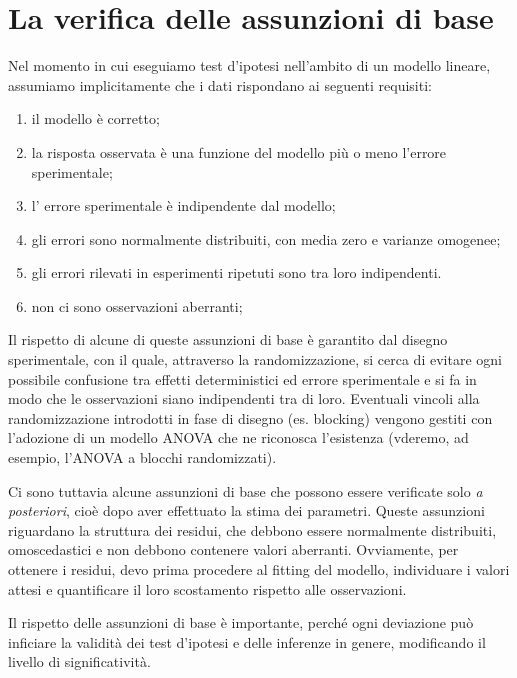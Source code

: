 \documentclass[a4paper,12pt,oneside]{book}
\providecommand{\tightlist}{%
  \setlength{\itemsep}{0pt}\setlength{\parskip}{0pt}}
\begin{document}
\hypertarget{la-verifica-delle-assunzioni-di-base}{%
\chapter{La verifica delle assunzioni di base}\label{la-verifica-delle-assunzioni-di-base}}

Nel momento in cui eseguiamo test d'ipotesi nell'ambito di un modello lineare, assumiamo implicitamente che i dati rispondano ai seguenti requisiti:

\begin{enumerate}
\def\labelenumi{\arabic{enumi}.}
\tightlist
\item
  il modello è corretto;
\item
  la risposta osservata è una funzione del modello più o meno l'errore sperimentale;
\item
  l' errore sperimentale è indipendente dal modello;
\item
  gli errori sono normalmente distribuiti, con media zero e varianze omogenee;
\item
  gli errori rilevati in esperimenti ripetuti sono tra loro indipendenti.
\item
  non ci sono osservazioni aberranti;
\end{enumerate}

Il rispetto di alcune di queste assunzioni di base è garantito dal disegno sperimentale, con il quale, attraverso la randomizzazione, si cerca di evitare ogni possibile confusione tra effetti deterministici ed errore sperimentale e si fa in modo che le osservazioni siano indipendenti tra di loro. Eventuali vincoli alla randomizzazione introdotti in fase di disegno (es. blocking) vengono gestiti con l'adozione di un modello ANOVA che ne riconosca l'esistenza (vderemo, ad esempio, l'ANOVA a blocchi randomizzati).

Ci sono tuttavia alcune assunzioni di base che possono essere verificate solo \emph{a posteriori}, cioè dopo aver effettuato la stima dei parametri. Queste assunzioni riguardano la struttura dei residui, che debbono essere normalmente distribuiti, omoscedastici e non debbono contenere valori aberranti. Ovviamente, per ottenere i residui, devo prima procedere al fitting del modello, individuare i valori attesi e quantificare il loro scostamento rispetto alle osservazioni.

Il rispetto delle assunzioni di base è importante, perché ogni deviazione può inficiare la validità dei test d'ipotesi e delle inferenze in genere, modificando il livello di significatività.
\end{document}
